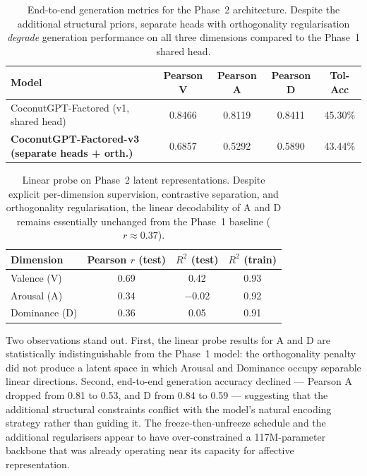\documentclass[12pt,twoside]{report}
\begin{document}
\begin{table}[H]
\centering
\begin{tabular}{lcccc}
\toprule
\textbf{Model} & \textbf{Pearson V} & \textbf{Pearson A} & \textbf{Pearson D} & \textbf{Tol-Acc} \\
\midrule
CoconutGPT-Factored (v1, shared head) & 0.8466 & 0.8119 & 0.8411 & 45.30\% \\
\textbf{CoconutGPT-Factored-v3 (separate heads + orth.)} & 0.6857 & 0.5292 & 0.5890 & 43.44\% \\
\bottomrule
\end{tabular}
\caption{End-to-end generation metrics for the Phase~2 architecture. Despite the additional structural priors, separate heads with orthogonality regularisation \emph{degrade} generation performance on all three dimensions compared to the Phase~1 shared head.}
\label{tab:factored_v3}
\end{table}

\begin{table}[H]
\centering
\begin{tabular}{lccc}
\toprule
\textbf{Dimension} & \textbf{Pearson $r$ (test)} & \textbf{$R^2$ (test)} & \textbf{$R^2$ (train)} \\
\midrule
Valence (V)   & 0.69 & 0.42 & 0.93 \\
Arousal (A)   & 0.34 & $-$0.02 & 0.92 \\
Dominance (D) & 0.36 & 0.05 & 0.91 \\
\bottomrule
\end{tabular}
\caption{Linear probe on Phase~2 latent representations. Despite explicit per-dimension supervision, contrastive separation, and orthogonality regularisation, the linear decodability of A and D remains essentially unchanged from the Phase~1 baseline ($r \approx 0.37$).}
\label{tab:probe_v3}
\end{table}

Two observations stand out.
First, the linear probe results for A and D are statistically indistinguishable from the Phase~1 model: the orthogonality penalty did not produce a latent space in which Arousal and Dominance occupy separable linear directions.
Second, end-to-end generation accuracy declined --- Pearson A dropped from 0.81 to 0.53, and D from 0.84 to 0.59 --- suggesting that the additional structural constraints conflict with the model's natural encoding strategy rather than guiding it.
The freeze-then-unfreeze schedule and the additional regularisers appear to have over-constrained a 117M-parameter backbone that was already operating near its capacity for affective representation.
\end{document}
